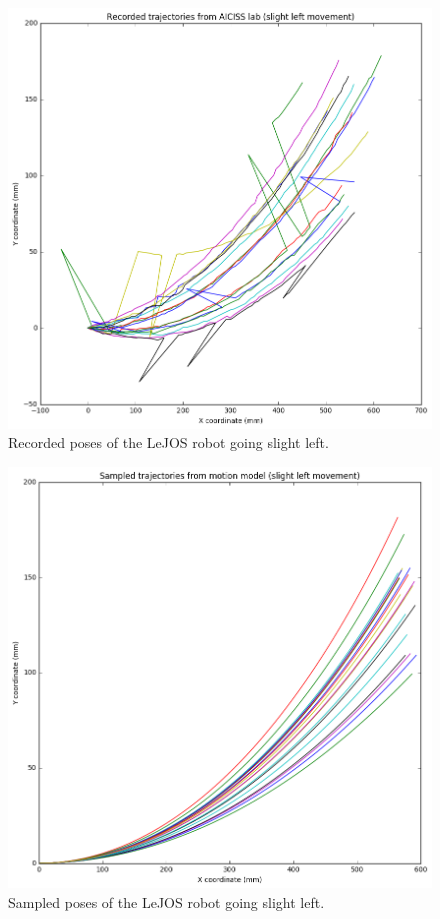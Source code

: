 \documentclass[paper=a4, fontsize=11pt]{scrartcl} %
\begin{document}
    \begin{figure}[h!]
        \begin{center}
            \setlength{\fboxsep}{0.5pt} %
            \setlength{\fboxrule}{0.5pt}
            \includegraphics[width=0.65\linewidth,fbox]{images/recorded_poses_slight_left.png}
            \caption{Recorded poses of the LeJOS robot going slight left.}
        \end{center}
    \end{figure}

    \begin{figure}[h!]
        \begin{center}
            \setlength{\fboxsep}{0.5pt} %
            \setlength{\fboxrule}{0.5pt}
            \includegraphics[width=0.65\linewidth,fbox]{images/sampled_poses_slightLeft.png}
            \caption{Sampled poses of the LeJOS robot going slight left.}
        \end{center}
    \end{figure}
    
\end{document}
